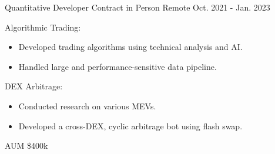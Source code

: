 \begin{cventries}

\cventry
{Quantitative Developer} %
{Contract in Person} %
{Remote} %
{Oct. 2021 - Jan. 2023} %
{ %
\begin{cvitems}
\item {Algorithmic Trading:}
\begin{itemize}
  \item {Developed trading algorithms using technical analysis and AI.}
  \item {Handled large and performance-sensitive data pipeline.}
\end{itemize}
\item {DEX Arbitrage:}
\begin{itemize}
  \item {Conducted research on various MEVs.}
  \item {Developed a cross-DEX, cyclic arbitrage bot using flash swap.}
\end{itemize}
\item {AUM \$400k}
\end{cvitems}
}


\end{cventries}
